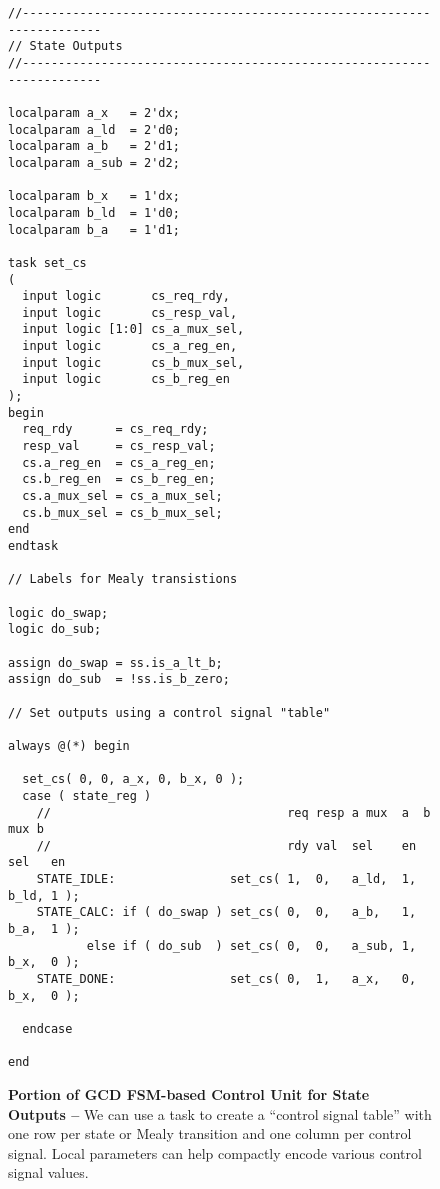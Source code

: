 
\begin{figure}

\begin{lstlisting}
//----------------------------------------------------------------------
// State Outputs
//----------------------------------------------------------------------

localparam a_x   = 2'dx;
localparam a_ld  = 2'd0;
localparam a_b   = 2'd1;
localparam a_sub = 2'd2;

localparam b_x   = 1'dx;
localparam b_ld  = 1'd0;
localparam b_a   = 1'd1;

task set_cs
(
  input logic       cs_req_rdy,
  input logic       cs_resp_val,
  input logic [1:0] cs_a_mux_sel,
  input logic       cs_a_reg_en,
  input logic       cs_b_mux_sel,
  input logic       cs_b_reg_en
);
begin
  req_rdy      = cs_req_rdy;
  resp_val     = cs_resp_val;
  cs.a_reg_en  = cs_a_reg_en;
  cs.b_reg_en  = cs_b_reg_en;
  cs.a_mux_sel = cs_a_mux_sel;
  cs.b_mux_sel = cs_b_mux_sel;
end
endtask

// Labels for Mealy transistions

logic do_swap;
logic do_sub;

assign do_swap = ss.is_a_lt_b;
assign do_sub  = !ss.is_b_zero;

// Set outputs using a control signal "table"

always @(*) begin

  set_cs( 0, 0, a_x, 0, b_x, 0 );
  case ( state_reg )
    //                                 req resp a mux  a  b mux b
    //                                 rdy val  sel    en sel   en
    STATE_IDLE:                set_cs( 1,  0,   a_ld,  1, b_ld, 1 );
    STATE_CALC: if ( do_swap ) set_cs( 0,  0,   a_b,   1, b_a,  1 );
           else if ( do_sub  ) set_cs( 0,  0,   a_sub, 1, b_x,  0 );
    STATE_DONE:                set_cs( 0,  1,   a_x,   0, b_x,  0 );

  endcase

end
\end{lstlisting}

  \caption{\textbf{Portion of GCD FSM-based Control Unit for State
      Outputs --} We can use a task to create a ``control signal table''
    with one row per state or Mealy transition and one column per control
    signal. Local parameters can help compactly encode various control
    signal values.}
  \label{code-tut3-gcd-ctrl}

\end{figure}

